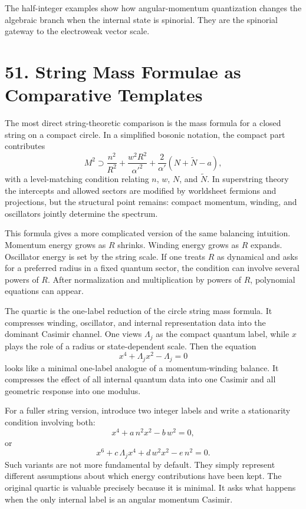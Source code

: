 \documentclass[11pt]{article}
\newcommand{\Lspin}{\Lambda_j}
\begin{document}
The half-integer examples show how angular-momentum quantization changes the algebraic branch when the internal state is spinorial. They are the spinorial gateway to the electroweak vector scale.

\section*{51. String Mass Formulae as Comparative Templates}

The most direct string-theoretic comparison is the mass formula for a closed string on a compact circle. In a simplified bosonic notation, the compact part contributes
\[
        M^2\supset
        \frac{n^2}{R^2}
        +
        \frac{w^2R^2}{\alpha'^2}
        +
        \frac{2}{\alpha'}(N+\tilde N-a),
\]
with a level-matching condition relating \(n\), \(w\), \(N\), and \(\tilde N\). In superstring theory the intercepts and allowed sectors are modified by worldsheet fermions and projections, but the structural point remains: compact momentum, winding, and oscillators jointly determine the spectrum.

This formula gives a more complicated version of the same balancing intuition. Momentum energy grows as \(R\) shrinks. Winding energy grows as \(R\) expands. Oscillator energy is set by the string scale. If one treats \(R\) as dynamical and asks for a preferred radius in a fixed quantum sector, the condition can involve several powers of \(R\). After normalization and multiplication by powers of \(R\), polynomial equations can appear.

The quartic is the one-label reduction of the circle string mass formula. It compresses winding, oscillator, and internal representation data into the dominant Casimir channel. One views \(\Lspin\) as the compact quantum label, while \(x\) plays the role of a radius or state-dependent scale. Then the equation
\[
        x^4+\Lspin x^2-\Lspin=0
\]
looks like a minimal one-label analogue of a momentum-winding balance. It compresses the effect of all internal quantum data into one Casimir and all geometric response into one modulus.

For a fuller string version, introduce two integer labels and write a stationarity condition involving both:
\[
        x^4+a\,n^2x^2-b\,w^2=0,
\]
or
\[
        x^6+c\,\Lspin x^4+d\,w^2x^2-e\,n^2=0 .
\]
Such variants are not more fundamental by default. They simply represent different assumptions about which energy contributions have been kept. The original quartic is valuable precisely because it is minimal. It asks what happens when the only internal label is an angular momentum Casimir.
\end{document}
